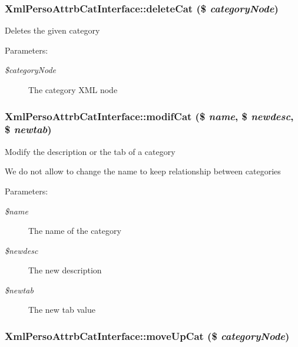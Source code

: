 \subsubsection{\setlength{\rightskip}{0pt plus 5cm}Xml\-Perso\-Attrb\-Cat\-Interface::delete\-Cat (\$ {\em category\-Node})}\label{classXmlPersoAttrbCatInterface_a2652885549922c862ad75f0fd686918}


Deletes the given category

\begin{Desc}
\item[Parameters:]
\begin{description}
\item[{\em \$category\-Node}]The category XML node \end{description}
\end{Desc}
\subsubsection{\setlength{\rightskip}{0pt plus 5cm}Xml\-Perso\-Attrb\-Cat\-Interface::modif\-Cat (\$ {\em name}, \$ {\em newdesc}, \$ {\em newtab})}\label{classXmlPersoAttrbCatInterface_ed34908157fcc523b76c6824b770c3a6}


Modify the description or the tab of a category

We do not allow to change the name to keep relationship between categories

\begin{Desc}
\item[Parameters:]
\begin{description}
\item[{\em \$name}]The name of the category \item[{\em \$newdesc}]The new description \item[{\em \$newtab}]The new tab value \end{description}
\end{Desc}
\subsubsection{\setlength{\rightskip}{0pt plus 5cm}Xml\-Perso\-Attrb\-Cat\-Interface::move\-Up\-Cat (\$ {\em category\-Node})}\label{classXmlPersoAttrbCatInterface_908233b7081903cbf4e06f265c546f40}


